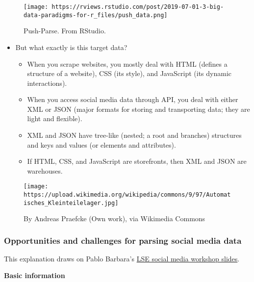 \documentclass[
]{book}
\begin{document}
\begin{figure}
\centering
\texttt{[image: https://rviews.rstudio.com/post/2019-07-01-3-big-data-paradigms-for-r\_files/push\_data.png]}
\caption{Push-Parse. From RStudio.}
\end{figure}

\begin{itemize}
\item
  But what exactly is this target data?

  \begin{itemize}
  \item
    When you scrape websites, you mostly deal with HTML (defines a structure of a website), CSS (its style), and JavaScript (its dynamic interactions).
  \item
    When you access social media data through API, you deal with either XML or JSON (major formats for storing and transporting data; they are light and flexible).
  \item
    XML and JSON have tree-like (nested; a root and branches) structures and keys and values (or elements and attributes).
  \item
    If HTML, CSS, and JavaScript are storefronts, then XML and JSON are warehouses.
  \end{itemize}
\end{itemize}

\begin{figure}
\centering
\texttt{[image: https://upload.wikimedia.org/wikipedia/commons/9/97/Automatisches\_Kleinteilelager.jpg]}
\caption{By Andreas Praefcke (Own work), via Wikimedia Commons}
\end{figure}

\hypertarget{opportunities-and-challenges-for-parsing-social-media-data}{%
\subsubsection{Opportunities and challenges for parsing social media data}\label{opportunities-and-challenges-for-parsing-social-media-data}}

This explanation draws on Pablo Barbara's \href{http://pablobarbera.com/social-media-workshop/social-media-slides.pdf}{LSE social media workshop slides}.

\textbf{Basic information}
\end{document}
